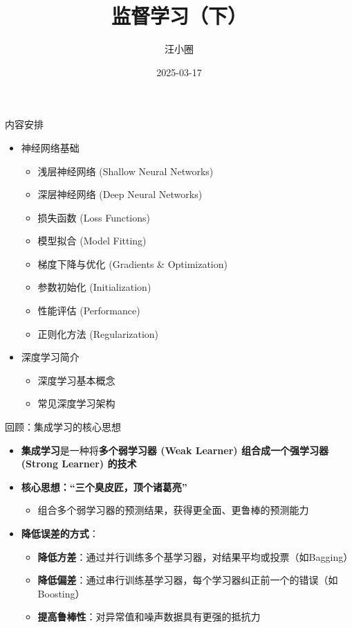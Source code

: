\documentclass[
  ignorenonframetext,
  aspectratio=169,
  chinese-hans,
]{beamer}
\title{监督学习（下）}
\author{汪小圈}
\date{2025-03-17}
\providecommand{\tightlist}{%
  \setlength{\itemsep}{0pt}\setlength{\parskip}{0pt}}\usepackage{longtable,booktabs,array}
\begin{document}
\frame{\titlepage}


\begin{frame}{内容安排}
\label{ux5185ux5bb9ux5b89ux6392}
\begin{itemize}
\tightlist
\item
  神经网络基础

  \begin{itemize}
  \tightlist
  \item
    浅层神经网络 (Shallow Neural Networks)
  \item
    深层神经网络 (Deep Neural Networks)
  \item
    损失函数 (Loss Functions)
  \item
    模型拟合 (Model Fitting)
  \item
    梯度下降与优化 (Gradients \& Optimization)
  \item
    参数初始化 (Initialization)
  \item
    性能评估 (Performance)
  \item
    正则化方法 (Regularization)
  \end{itemize}
\item
  深度学习简介

  \begin{itemize}
  \tightlist
  \item
    深度学习基本概念
  \item
    常见深度学习架构
  \end{itemize}
\end{itemize}
\end{frame}

\begin{frame}{回顾：集成学习的核心思想}
\label{ux56deux987eux96c6ux6210ux5b66ux4e60ux7684ux6838ux5fc3ux601dux60f3}
\begin{itemize}
\item
  \textbf{集成学习}是一种将\textbf{多个弱学习器 (Weak Learner)
  组合成一个强学习器 (Strong Learner) 的技术}
\item
  \textbf{核心思想：``三个臭皮匠，顶个诸葛亮''}

  \begin{itemize}
  \tightlist
  \item
    组合多个弱学习器的预测结果，获得更全面、更鲁棒的预测能力
  \end{itemize}
\item
  \textbf{降低误差的方式}：

  \begin{itemize}
  \tightlist
  \item
    \textbf{降低方差}：通过并行训练多个基学习器，对结果平均或投票（如Bagging）
  \item
    \textbf{降低偏差}：通过串行训练基学习器，每个学习器纠正前一个的错误（如Boosting）
  \item
    \textbf{提高鲁棒性}：对异常值和噪声数据具有更强的抵抗力
  \end{itemize}
\end{itemize}
\end{frame}
\end{document}
